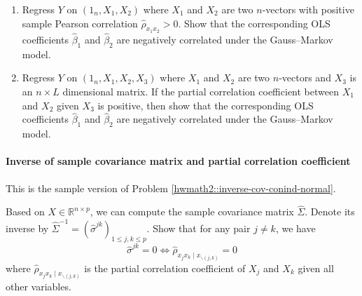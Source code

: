 \begin{enumerate}
\item
Regress $Y$ on $(1_n,X_1, X_2)$ where $X_1$ and $X_2$ are two $n$-vectors with positive sample Pearson correlation $\hat\rho_{x_1x_2} > 0$. Show that the corresponding OLS coefficients $\hat{\beta}_1$ and $\hat{\beta}_2$ are negatively correlated under the Gauss--Markov model.

\item
Regress $Y$ on $(1_n,X_1, X_2, X_3)$ where $X_1$ and $X_2$ are two $n$-vectors and $X_3$ is an $n\times L$ dimensional matrix. If the partial correlation coefficient between $X_1$ and $X_2$ given $X_3$ is positive, then show that the corresponding OLS coefficients $\hat{\beta}_1$ and $\hat{\beta}_2$ are negatively correlated under the Gauss--Markov model.
\end{enumerate}




\paragraph{Inverse of sample covariance matrix and partial correlation coefficient}\label{hw::7:inverse-samplecov-pcc}

This is the sample version of Problem \ref{hwmath2::inverse-cov-conind-normal}.


Based on $X \in \mathbb{R}^{n\times p}$, we can compute the sample covariance matrix $\hat\Sigma$. Denote its inverse by $\hat\Sigma^{-1} = (\hat{\sigma}^{jk})_{1\leq j,k\leq p}$. Show that for any pair $j\neq k$, we have 
$$
\hat{\sigma}^{jk} = 0 \Longleftrightarrow \hat{\rho}_{x_jx_k\mid x_{\backslash (j,k)}} = 0
$$
where $\hat{\rho}_{x_jx_k\mid x_{\backslash (j,k)}} $ is the partial correlation coefficient of $X_j$ and $X_k$ given all other variables. 


